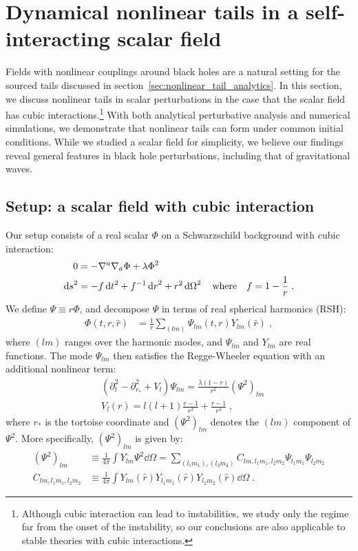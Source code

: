 \documentclass[reprint,aps,physrev,superscriptaddress,10pt,notitlepage,prd,nofootinbib,onecolumn]{revtex4-2}
\newcommand{\sref}[1]{section~\ref{#1}}
\begin{document}
\section{Dynamical nonlinear tails in a self-interacting scalar field}
\label{sec:self_interacting_scalar_field}
Fields with nonlinear couplings around black holes are a natural setting for the sourced tails discussed in \sref{sec:nonlinear_tail_analytics}.
In this section, we discuss nonlinear tails in scalar perturbations in the case that the scalar field has cubic interactions.\footnote{Although cubic interaction can lead to instabilities, we study only the regime far from the onset of the instability, so our conclusions are also applicable to stable theories with cubic interactions.}
With both analytical perturbative analysis and numerical simulations, we demonstrate that nonlinear tails can form under common initial conditions.
While we studied a scalar field for simplicity, we believe our findings reveal general features in black hole perturbations, including that of gravitational waves.

\subsection{Setup: a scalar field with cubic interaction}
\label{sec:coupled_simulation_setup}

Our setup consists of a real scalar $\Phi$ on a Schwarzschild background with cubic interaction:
\begin{align}
  \label{eq:cubic_scalar_Phi_eqn}
  0 &= -\nabla^a \nabla_a \Phi + \lambda \Phi^2 \nonumber \\
  \dd{s}^2 &= -f \dd{t}^2 + f^{-1} \dd{r}^2 + r^2 \dd{\Omega}^2 \qq{where} f = 1 - \frac{1}{r} \;.
\end{align}
We define $\Psi \equiv r \Phi$, and decompose $\Psi$ in terms of real spherical harmonics (RSH):
\begin{align}
  \Phi(t, r, \hat{r}) &= \frac{1}{r} \sum_{(lm)} \Psi_{lm}(t, r) Y_{lm}(\hat{r}) \;,
\end{align}
where $(lm)$ ranges over the harmonic modes, and $\Psi_{lm}$ and $Y_{lm}$ are real functions.
The mode $\Psi_{lm}$ then satisfies the Regge-Wheeler equation with an additional nonlinear term:
\begin{align}
  \label{eq:cubic_scalar_Psi_lm_eqn}
  & (\partial_t^2 -  \partial_{r_*}^2 + V_l) \Psi_{lm}
    =  \frac{\lambda(1-r)}{r^2} (\Psi^2)_{lm} \nonumber \\
  & V_l(r) =  l (l+1) \frac{r-1}{r^3} + \frac{r-1}{r^4} \;,
\end{align}
where $r_*$ is the tortoise coordinate and $(\Psi^2)_{lm}$ denotes the $(lm)$ component of $\Psi^2$.
More specifically, $(\Psi^2)_{lm}$ is given by:
\begin{align}
  (\Psi^2)_{lm} &\equiv \frac{1}{4\pi} \int Y_{lm} \Psi^2 \dd{\Omega} = \sum_{(l_1 m_1), (l_2 m_2)} C_{lm,l_1 m_1,l_2 m_2} \Psi_{l_1 m_1} \Psi_{l_2 m_2} \nonumber \\
  C_{lm,l_1 m_1,l_2 m_2} &\equiv \frac{1}{4\pi} \int Y_{lm}(\hat{r}) Y_{l_1 m_1}(\hat{r}) Y_{l_2 m_2}(\hat{r}) \dd{\Omega} \;.
\end{align}
\end{document}
